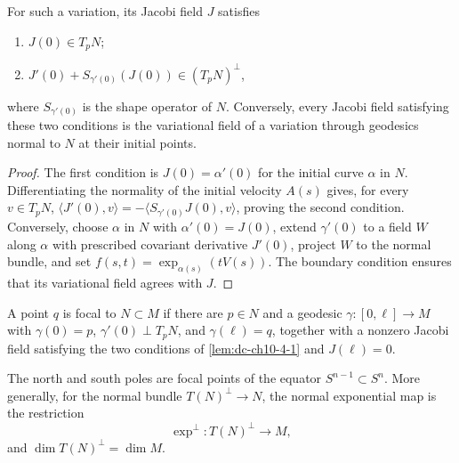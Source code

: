 \begin{lemma}
  \label{lem:dc-ch10-4-1}
  For such a variation, its Jacobi field $J$ satisfies
  \begin{enumerate}
  \item $J(0)\in T_pN$;
  \item $J'(0)+S_{\gamma'(0)}(J(0))\in(T_pN)^\perp$,
  \end{enumerate}
  where $S_{\gamma'(0)}$ is the shape operator of $N$. Conversely, every Jacobi
  field satisfying these two conditions is the variational field of a variation
  through geodesics normal to $N$ at their initial points.
\end{lemma}
\begin{proof}
  \sketch
  The first condition is $J(0)=\alpha'(0)$ for the initial curve $\alpha$ in $N$.
  Differentiating the normality of the initial velocity $A(s)$ gives, for every
  $v\in T_pN$,
  $\langle J'(0),v\rangle=-\langle S_{\gamma'(0)}J(0),v\rangle$, proving the
  second condition. Conversely, choose $\alpha$ in $N$ with $\alpha'(0)=J(0)$,
  extend $\gamma'(0)$ to a field $W$ along $\alpha$ with prescribed covariant
  derivative $J'(0)$, project $W$ to the normal bundle, and set
  $f(s,t)=\exp_{\alpha(s)}(tV(s))$. The boundary condition ensures that its
  variational field agrees with $J$.
\end{proof}

\begin{definition}
  \label{def:dc-ch10-4-2}
  A point $q$ is focal to $N\subset M$ if there are $p\in N$ and a geodesic
  $\gamma:[0,\ell]\to M$ with $\gamma(0)=p$, $\gamma'(0)\perp T_pN$, and
  $\gamma(\ell)=q$, together with a nonzero Jacobi field satisfying the two
  conditions of \cref{lem:dc-ch10-4-1} and $J(\ell)=0$.
\end{definition}

\begin{example}
  \label{ex:dc-ch10-4-3}
  The north and south poles are focal points of the equator $S^{n-1}\subset S^n$.
  More generally, for the normal bundle $T(N)^\perp\to N$, the normal exponential
  map is the restriction
  \[
  \exp^\perp:T(N)^\perp\to M,
  \]
  and $\dim T(N)^\perp=\dim M$.
\end{example}

